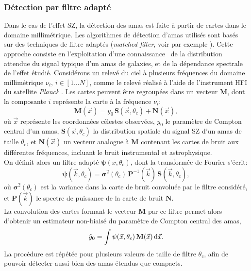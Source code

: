 \subsubsection{Détection par filtre adapté} %
Dans le cas de l'effet SZ, la détection des amas est faite à partir de cartes dans le domaine millimétrique.
Les algorithmes de détection d'amas utilisés sont basés sur des techniques de filtre adaptés (\textit{matched filter}, voir par exemple \cite{melin_catalog_2006, melin_comparison_2012, zubeldia_understanding_2021}).
Cette approche consiste en l'exploitation d'une connaissance \prior\ de la distribution attendue du signal typique d'un amas de galaxies, et de la dépendance spectrale de l'effet étudié.
Considérons un relevé du ciel à plusieurs fréquences du domaine millimétrique $\nu_i, \, i \in [1 \dots N]$, comme le relevé réalisé à l'aide de l'instrument HFI du satellite \textit{Planck} \cite{lamarre_planck_2010,planck_collaboration_planck_2020-1}.
Les cartes peuvent être regroupées dans un vecteur $\mathbf{M}$, dont la composante $i$ représente la carte à la fréquence $\nu_i$:
\begin{equation}
    \label{eq:matched_filter}
    \mathbf{M}(\vec{x}) = y_0 \, \mathbf{S}(\vec{x}, \theta_c) + \mathbf{N}(\vec{x}),
\end{equation}
où $\vec{x}$ représente les coordonnées célestes observées, $y_0$ le paramètre de Compton central d'un amas, $\mathbf{S}(\vec{x}, \theta_c)$ la distribution spatiale du signal SZ d'un amas de taille $\theta_c$, et $\mathbf{N}(\vec{x})$ un vecteur analogue à $\mathbf{M}$ contenant les cartes de bruit aux différentes fréquences, incluant le bruit instrumental et astrophysique. \\
On définit alors un filtre adapté $\mathbf{\psi}(x, \theta_c)$, dont la transformée de Fourier s'écrit:
\begin{equation}
    \label{eq:matched_filter_filter}
    \mathbf{\psi}(\vec{k}, \theta_c) = \mathbf{\sigma}^2(\theta_c) \, \mathbf{P}^{-1}(\vec{k}) \, \mathbf{S}(\vec{k}, \theta_c),
\end{equation}
où $\mathbf{\sigma}^2(\theta_c)$ est la variance dans la carte de bruit convoluée par le filtre considéré, et $\mathbf{P}(\vec{k})$ le spectre de puissance de la carte de bruit $\mathbf{N}$. \\
La convolution des cartes formant le vecteur $\mathbf{M}$ par ce filtre permet alors d'obtenir un estimateur non-biaisé du paramètre de Compton central des amas,
\begin{equation}
    \hat{y}_0 = \int \mathbf{\psi}(\vec{x}, \theta_c) \, \mathbf{M}(\vec{x}) \, \mathrm{d}\vec{x}.
\end{equation}
La procédure est répétée pour plusieurs valeurs de taille de filtre $\theta_c$, afin de pouvoir détecter aussi bien des amas étendus que compacts.

